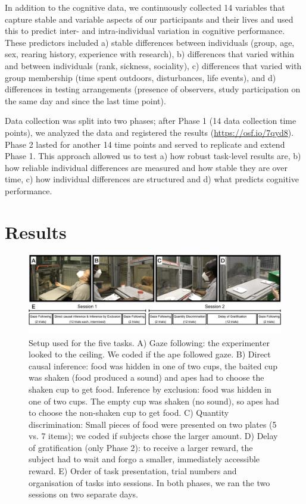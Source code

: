 \documentclass[
  man,floatsintext]{apa6}
\begin{document}
In addition to the cognitive data, we continuously collected 14 variables that capture stable and variable aspects of our participants and their lives and used this to predict inter- and intra-individual variation in cognitive performance. These predictors included a) stable differences between individuals (group, age, sex, rearing history, experience with research), b) differences that varied within and between individuals (rank, sickness, sociality), c) differences that varied with group membership (time spent outdoors, disturbances, life events), and d) differences in testing arrangements (presence of observers, study participation on the same day and since the last time point).

Data collection was split into two phases; after Phase 1 (14 data collection time points), we analyzed the data and registered the results (\url{https://osf.io/7qyd8}). Phase 2 lasted for another 14 time points and served to replicate and extend Phase 1. This approach allowed us to test a) how robust task-level results are, b) how reliable individual differences are measured and how stable they are over time, c) how individual differences are structured and d) what predicts cognitive performance.

\hypertarget{results}{%
\section{Results}\label{results}}

\begin{figure}
\includegraphics[width=1\linewidth]{./figures/setup} \caption{Setup used for the five tasks. A) Gaze following: the experimenter looked to the ceiling. We coded if the ape followed gaze. B) Direct causal inference: food was hidden in one of two cups, the baited cup was shaken (food produced a sound) and apes had to choose the shaken cup to get food. Inference by exclusion: food was hidden in one of two cups. The empty cup was shaken (no sound), so apes had to choose the non-shaken cup to get food. C) Quantity discrimination: Small pieces of food were presented on two plates (5 vs. 7 items); we coded if subjects chose the larger amount. D) Delay of gratification (only Phase 2): to receive a larger reward, the subject had to wait and forgo a smaller, immediately accessible reward. E) Order of task presentation, trial numbers and organisation of tasks into sessions. In both phases, we ran the two sessions on two separate days.}\label{fig:setup}
\end{figure}
\end{document}
